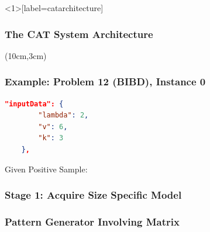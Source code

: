 \begin{frame}<1>[label=catarchitecture]
\frametitle{The CAT System Architecture}
\scalebox{0.35}{

}
\begin{textblock*}{6cm}(10cm,3cm)
\scalebox{0.5}{}
\end{textblock*}

\end{frame}


\begin{frame}[fragile]
\frametitle{Example: Problem 12 (BIBD), Instance 0}
\begin{lstlisting}[language=json,basicstyle=\tiny]
    "inputData": {
        "lambda": 2,
        "v": 6,
        "k": 3
    },
\end{lstlisting}
Given Positive Sample:

\end{frame}

\begin{frame}
\frametitle{Stage 1: Acquire Size Specific Model}
\scalebox{0.65}{

}
\end{frame}

\begin{frame}
\frametitle{Pattern Generator Involving Matrix}

\end{frame}

